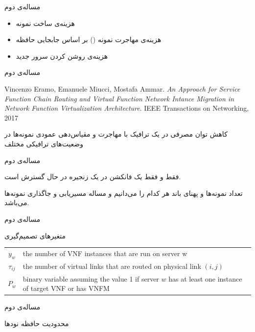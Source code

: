 \documentclass{beamer}
\makeatletter
\newcommand{\RTList}{\raggedleft\rightskip\@totalleftmargin}
\makeatother
\begin{document}
\begin{persian}
\begin{frame}{مساله‌ی دوم}
\begin{itemize}
		\begin{itemize}\RTList{}
			\item هزینه‌ی ساخت نمونه
			\item هزینه‌ی مهاجرت نمونه () بر اساس جابجایی حافظه
			\item هزینه‌ی روشن کردن سرور جدید
		\end{itemize}
	\end{itemize}
\end{frame}
\begin{frame}{مساله‌ی دوم}
	\begin{latin}\begin{thebibliography}{9}
		Vincenzo Eramo, Emanuele Miucci, Mostafa Ammar.
		\textit{An Approach for Service Function Chain Routing and Virtual Function Network Intance Migration in Network Function Virtualization Architecture}. 
		IEEE Transactions on Networking, 2017
	\end{thebibliography}\end{latin}
	\par
	کاهش توان مصرفی در یک ترافیک 
	با مهاجرت و مقیاس‌دهی عمودی نمونه‌ها در وضعیت‌های ترافیکی مختلف
\end{frame}
\begin{frame}{مساله‌ی دوم}
	\par
	فقط و فقط یک فانکشن در یک زنجیره در حال گسترش است.
	\par
	تعداد نمونه‌ها و پهنای باند هر کدام را می‌دانیم و مساله مسیریابی و جاگذاری نمونه‌ها می‌باشد.
\end{frame}
\begin{frame}{مساله‌ی دوم}
	\par
	متغیرهای تصمیم‌گیری
	\begin{latin}\begin{tabular}{c p{10cm}}
		$y_w$ & the number of VNF instances that are run on server w\\
		$\tau_{ij}$ & the number of virtual links that are routed on physical link $(i,j)$\\
		$P_w$ & binary variable assuming the value 1 if server $w$ has at least one instance of target VNF or has VNFM\\
	\end{tabular}\end{latin}
\end{frame}
\begin{frame}{مساله‌ی دوم}
	\par
	محدودیت حافظه نودها
	\begin{latin}\begin{align}

\end{align}
\end{latin}
\end{frame}
\end{persian}
\end{document}
